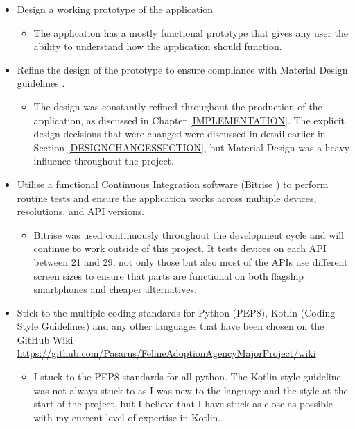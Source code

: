 \begin{itemize}
    \item Design a working prototype of the application
    \begin{itemize}
        \item The application has a mostly functional prototype that gives any user the ability to understand how the application should function.
    \end{itemize}
    
    \item Refine the design of the prototype to ensure compliance with Material Design guidelines \cite{MATERIALDESIGNGUIDELINES}.
    \begin{itemize}
        \item The design was constantly refined throughout the production of the application, as discussed in Chapter \ref{IMPLEMENTATION}. The explicit design decisions that were changed were discussed in detail earlier in Section \ref{DESIGNCHANGESSECTION}, but Material Design was a heavy influence throughout the project.
    \end{itemize}
    
    \item Utilise a functional Continuous Integration software (Bitrise \cite{BITRISE}) to perform routine tests and ensure the application works across multiple devices, resolutions, and API versions.
    \begin{itemize}
        \item Bitrise was used continuously throughout the development cycle and will continue to work outside of this project. It tests devices on each API between 21 and 29, not only those but also most of the APIs use different screen sizes to ensure that parts are functional on both flagship smartphones and cheaper alternatives.
    \end{itemize}
    
    \item Stick to the multiple coding standards for Python (PEP8), Kotlin (Coding Style Guidelines) and any other languages that have been chosen on the GitHub Wiki
    \url{https://github.com/Pasarus/FelineAdoptionAgencyMajorProject/wiki}
    \begin{itemize}
        \item I stuck to the PEP8 standards for all python. The Kotlin style guideline was not always stuck to as I was new to the language and the style at the start of the project, but I believe that I have stuck as close as possible with my current level of expertise in Kotlin.
    \end{itemize}
    

\end{itemize}
